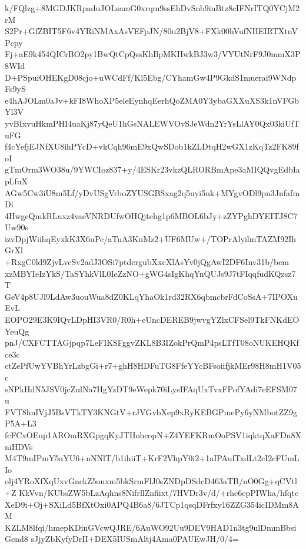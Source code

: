 k/FQlzg+8MGDJKRpaduJOLsamG0xrqm9ssEhDvSnb9inBtz8cIFNrITQ0YCjM2rM
S2Pr+GfZBIT5F6v4YRiNMAxAsVEFpJN/80u2BjV8+FXk00hVufNHEIRTXtnVPcpy
Fj+aE9k454QICrBO2py1BwQtCpQssKhIlpMKHwkBJ3w3/VYUtNrF9J0mmX3P8WId
D+PSpuiOHEKgD08cjo+uWCdFf/Kl5Ebg/CYhamGw4P9GkdS1muerai9WNdpFs9yS
e4hAJOLm0aJv+kFI8WhoXP5eleEynhqEerhQoZMA0Y3ybaGXXuXS3k1nVFGbYl3V
yvBIxvuHkmPHI4uaKj87yQeU1hGsNALEWVOvSJeWdn2YrYsLlAY0Qx03kiUfTuFG
f4cYefjEJNfXU8ihPYcD+vkCqh96mE9xQwSDob1kZLDtqH2wGX1zKqTz2FK89foI
gTmOrm3WO38u/9YWCIoz837+y/4ESKr23vkzQLRORBmApe3aMIQQvgEdbIapLfuX
AGw5Cw3iU8m5Lf/yDvUSgVrboZYUSGBSxag2q5uyi5nk+MYgvODl9pn3JnfafmDi
4HwgeQmkRLuxz4vaeVNRDUfwOHQjtehg1p6MBOL6bJy+zZYPghDYEITJ8C7Uw90s
izvDpjWiihqEyxkK3X6uPe/aTuA3KuMz2+UF6MUw+/TOPrAlyilmTAZM92IhGrXl
+RxgC0ld9ZjvLvcSv2adJ3OSi7ptdcrgubXxcXlAsYv0jQgAwI2DF6Inv31b/bem
xzMBYIeIzYkS/TaSYhkVlL0IeZzNO+gWG4sIgKhqYnQUJs9J7tFIqqfudKQzsz7T
GeV4p8UJl9LdAw3uouWua8dZ0KLqYhaOk1rd32RX6qbmcbrFdCoSsA+7IPOXuEvL
EOPO29E3K9IQvLDpHI3VR0/R0h+eUncDEREB9jwvgYZlxCFSel9TkFNKdEOYeuQg
pnJ/CXFCTTAGjpqp7LeFIKSFggvZKL8B3IZokPrQmP4psLTfT08oNUKEHQKfce3c
ctZePfUwYVBhYrLzbgGi+r7+ghH8HDFuTG8FfeYYcBFsoiifjkMEr98H8mH1V05c
sNPkHdN5JSV0jcZulNa7HgYzDT9eWepk70iLysIFAqUxTvxFPofYAdi7eEFSM07u
FVT8hnIVjJ5BsVTkTY3KNGtV+rJVGvbXep9xRyKEBGPmePy6yNMbotZZ9gP5A+L3
fcFCxOEup1AROmRXGpgqKyJTHohcopN+Z4YEFKRmOoPSV1iqktqXaFDn8XniHDVs
M4T9mIPmY5aYU6+nNNlT/b1ihiiT+KrF2VhpY0i2+1aIPAufTxdLt2cI2cFUmLIo
olj4YRoXfXqUxvGnckZ5ouxm5bkSrmFlJ0sZNDpDSdcD463aTB/nO0Gg+qCVtl+Z
KkVvn/KUbsZW5bLzAqhns8NifrllZnfiixt/7HVDr3v/d/+rhe6epPIWha/hfqtc
XeD9i+Oj+SXiLd5BfXtOxi0APQ4B6a8/6JTCp1qsqDFrfxy16ZZG354icIDMm8AM
KZLM8lfqi/hmepKDinGVcwQJRE/6AuWO92Uu9DEV9HAD1n3tg9ulDmmBbsiGend8
sJjyZbKyfyDrII+DEX5IUSmAltj4Ama0PAUEwJH/0/4=
